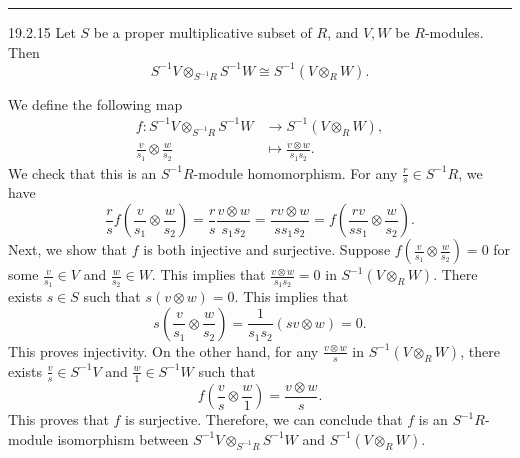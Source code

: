 \documentclass[a4paper, 12pt]{article}
\begin{document}
\noindent\rule{7in}{2.8pt}
\begin{problem}{19.2.15}
Let \(S\) be a proper multiplicative subset of \(R\), and \(V, W\) be \(R\)-modules. Then 
\[S^{-1}V\otimes_{S^{-1}R}S^{-1}W\cong S^{-1}(V\otimes_R W).\]
\end{problem}
\begin{solution}
We define the following map 
\begin{align*}
    f:S^{-1}V\otimes_{S^{-1}R}S^{-1}W&\rightarrow S^{-1}(V\otimes_R W),\\ 
      \frac{v}{s_1}\otimes \frac{w}{s_2}&\mapsto \frac{v\otimes w}{s_1s_2}.
\end{align*}
We check that this is an \(S^{-1}R\)-module homomorphism. For any \(\frac{r}{s}\in S^{-1}R\), we have 
\[\frac{r}{s}f(\frac{v}{s_1}\otimes \frac{w}{s_2})=\frac{r}{s}\frac{v\otimes w}{s_1s_2}=\frac{rv\otimes w}{ss_1s_2}=f(\frac{rv}{ss_1}\otimes \frac{w}{s_2}).\]
Next, we show that \(f\) is both injective and surjective. Suppose \(f(\frac{v}{s_1}\otimes \frac{w}{s_2})=0\) for some \(\frac{v}{s_1}\in V\) and \(\frac{w}{s_2}\in W\). This implies that \(\frac{v\otimes w}{s_1s_2}=0\) in \(S^{-1}(V\otimes_R W)\). There exists \(s\in S\) such that \(s(v\otimes w)=0\). This implies that 
\[s(\frac{v}{s_1}\otimes\frac{w}{s_2})=\frac{1}{s_1s_2}(sv\otimes w)=0.\]
This proves injectivity. On the other hand, for any \(\frac{v\otimes w}{s}\) in \(S^{-1}(V\otimes_R W)\), there exists \(\frac{v}{s}\in S^{-1}V\) and \(\frac{w}{1}\in S^{-1}W\) such that 
\[f(\frac{v}{s}\otimes \frac{w}{1})=\frac{v\otimes w}{s}.\]
This proves that \(f\) is surjective. Therefore, we can conclude that \(f\) is an \(S^{-1}R\)-module isomorphism between \(S^{-1}V\otimes_{S^{-1}R}S^{-1}W\) and \(S^{-1}(V\otimes_R W)\).
\end{solution}
\end{document}
